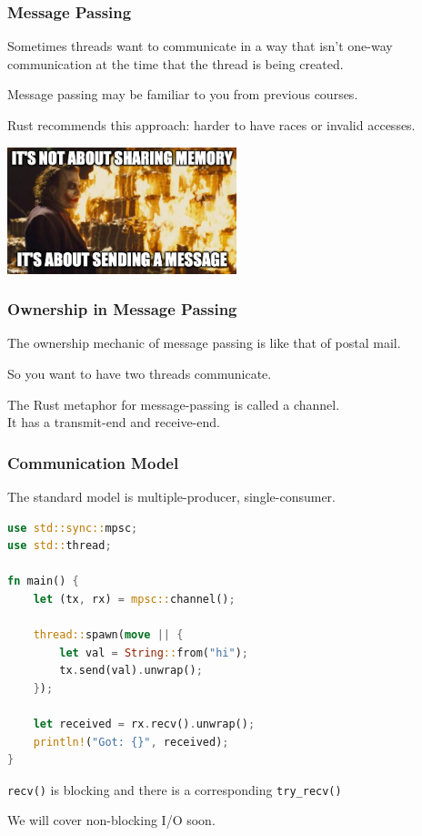 \begin{frame}
\frametitle{Message Passing}

Sometimes threads want to communicate in a way that isn't one-way communication at the time that the thread is being created.

Message passing may be familiar to you from previous courses.

Rust recommends this approach: harder to have races or invalid accesses.

\begin{center}
	\includegraphics[width=0.5\textwidth]{images/sending-a-message.jpg}
\end{center}

\end{frame}


\begin{frame}
\frametitle{Ownership in Message Passing}

The ownership mechanic of message passing is like that of postal mail. 

So you want to have two threads communicate. 

The Rust metaphor for message-passing is called a \alert{channel}.\\
\quad It has a transmit-end and receive-end.

\end{frame}


\begin{frame}[fragile]
\frametitle{Communication Model}
The standard model is multiple-producer, single-consumer.

\begin{lstlisting}[language=Rust]
use std::sync::mpsc;
use std::thread;

fn main() {
    let (tx, rx) = mpsc::channel();

    thread::spawn(move || {
        let val = String::from("hi");
        tx.send(val).unwrap();
    });

    let received = rx.recv().unwrap();
    println!("Got: {}", received);
}
\end{lstlisting}

\texttt{recv()} is blocking and there is a corresponding \texttt{try\_recv()} 

We will cover non-blocking I/O soon.

\end{frame}


